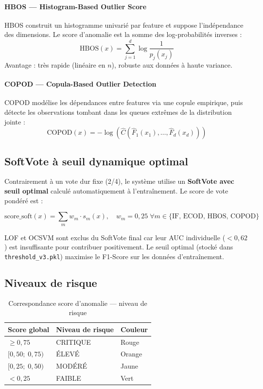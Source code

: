 \documentclass[12pt,a4paper]{report}
\begin{document}
\paragraph{HBOS — Histogram-Based Outlier Score}
HBOS construit un histogramme univarié par feature et suppose l'indépendance des dimensions.
Le score d'anomalie est la somme des log-probabilités inverses :
\begin{equation}
  \text{HBOS}(x) = \sum_{j=1}^{d} \log\!\frac{1}{p_j(x_j)}
\end{equation}
Avantage : très rapide (linéaire en $n$), robuste aux données à haute variance.

\paragraph{COPOD — Copula-Based Outlier Detection}
COPOD modélise les dépendances entre features via une copule empirique, puis
détecte les observations tombant dans les queues extrêmes de la distribution jointe :
\begin{equation}
  \text{COPOD}(x) = -\log\!\left(\hat{C}\!\left(\hat{F}_1(x_1),\ldots,\hat{F}_d(x_d)\right)\right)
\end{equation}

\subsection{SoftVote à seuil dynamique optimal}

Contrairement à un vote dur fixe (2/4), le système utilise un \textbf{SoftVote avec seuil
optimal} calculé automatiquement à l'entraînement. Le score de vote pondéré est :

\begin{equation}
  \text{score\_soft}(x) = \sum_{m} w_m \cdot s_m(x), \quad w_m = 0{,}25 \; \forall m \in \{\text{IF, ECOD, HBOS, COPOD}\}
\end{equation}

LOF et OCSVM sont exclus du SoftVote final car leur AUC individuelle ($< 0{,}62$) est
insuffisante pour contribuer positivement. Le seuil optimal (stocké dans
\texttt{threshold\_v3.pkl}) maximise le F1-Score sur les données d'entraînement.

\subsection{Niveaux de risque}

\begin{table}[h]
\centering
\caption{Correspondance score d'anomalie — niveau de risque}
\begin{tabular}{lll}
\toprule
\textbf{Score global} & \textbf{Niveau de risque} & \textbf{Couleur} \\
\midrule
$\geq 0{,}75$        & CRITIQUE & Rouge   \\
$[0{,}50;\; 0{,}75)$ & ÉLEVÉ    & Orange  \\
$[0{,}25;\; 0{,}50)$ & MODÉRÉ   & Jaune   \\
$< 0{,}25$           & FAIBLE   & Vert    \\
\bottomrule
\end{tabular}
\end{table}
\end{document}
